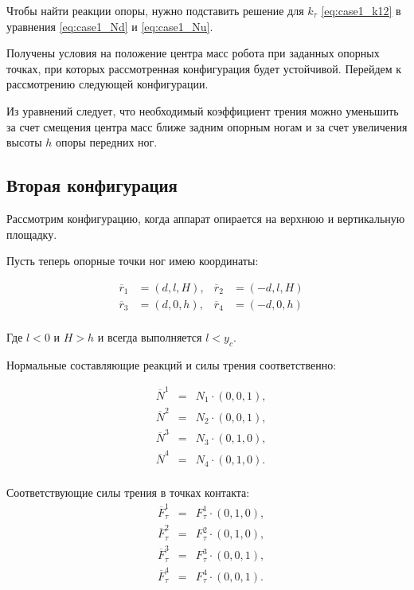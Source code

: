Чтобы найти реакции опоры, нужно подставить решение для $k_\tau$ \ref{eq:case1_k12} в уравнения \ref{eq:case1_Nd} и \ref{eq:case1_Nu}. 

Получены условия на положение центра масс робота при заданных опорных точках, при которых рассмотренная конфигурация будет устойчивой. Перейдем к рассмотрению следующей конфигурации.

Из уравнений  следует, что необходимый коэффициент трения можно уменьшить за счет смещения центра масс ближе задним опорным ногам и за счет увеличения высоты $h$ опоры передних ног.


\subsection{Вторая конфигурация}

Рассмотрим конфигурацию, когда аппарат опирается на верхнюю и вертикальную площадку.


Пусть теперь опорные точки ног имею координаты:

\begin{equation}
\label{eq:step_points_phase_2}
\begin{alignedat}{3}
&\overline{r}_1 &= (d, l, H) , &\overline{r}_2 &= (-d, l, H) \\
&\overline{r}_3 &= (d, 0, h) , &\overline{r}_4 &= (-d, 0, h) \\
\end{alignedat}
\end{equation}

Где $l < 0$ и $H > h$ и всегда выполняется $l < y_c$.

Нормальные составляющие реакций и силы трения соответственно:

\begin{equation}
\label{eq:N_i}
\begin{alignedat}{3}
&\overline{N}^1 &= &N_1\cdot(0,0,1),  \\
&\overline{N}^2 &= &N_2\cdot(0,0,1),  \\
&\overline{N}^3 &= &N_3\cdot(0,1,0),  \\
&\overline{N}^4 &= &N_4\cdot(0,1,0).  \\
\end{alignedat}
\end{equation}

Соответствующие силы трения в точках контакта:
\begin{equation}
\label{eq:F_tau_i}
\begin{alignedat}{3}
&\overline{F}_\tau^1 &= &F_\tau^1\cdot(0,1,0),  \\
&\overline{F}_\tau^2 &= &F_\tau^2\cdot(0,1,0),  \\
&\overline{F}_\tau^3 &= &F_\tau^3\cdot(0,0,1),  \\
&\overline{F}_\tau^4 &= &F_\tau^4\cdot(0,0,1).  \\
\end{alignedat}
\end{equation}

